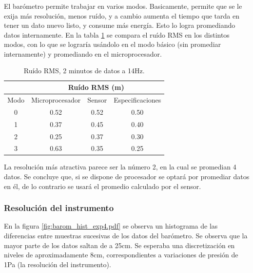 \documentclass[spanish,12pt,a4paper,titlepage]{report}
\begin{document}
El barómetro permite trabajar en varios modos. Basicamente, permite que se le exija más resolución, menos ruído, y a cambio aumenta el tiempo que tarda en tener un dato nuevo listo, y consume más energía. Esto lo logra promediando datos internamente. En la tabla \ref{tab:ruido-rms} se compara el ruído RMS en los distintos modos, con lo que se lograría usándolo en el modo básico (sin promediar internamente) y promediando en el microprocesador.

\begin{table}[H]
\centering
\begin{tabular}{c|c|c|c|} 
\cline{2-4}
	& \multicolumn{3}{|c|}{\cellcolor[gray]{0.8} Ruído RMS  (m)}      \\ \hline
\multicolumn{1}{|c|}{\cellcolor[gray]{0.8} {Modo}} & \cellcolor[gray]{0.8} {Microprocesador} &\cellcolor[gray]{0.8} {Sensor} &\cellcolor[gray]{0.8} {Especificaciones}\\ \hline

\multicolumn{1}{|c|}{0}	&	0.52	&	0.52	&	0.50\\
\hline
\multicolumn{1}{|c|}{1}	&	0.37	&	0.45	&	0.40\\
\hline
\multicolumn{1}{|c|}{2}	&	0.25	&	0.37	&	0.30\\
\hline
\multicolumn{1}{|c|}{3}	&	0.63	&	0.35	&	0.25\\
\hline

\end{tabular}
\caption{Ruído RMS, 2 minutos de datos a 14Hz.}
\label{tab:ruido-rms}
\end{table}
\vspace{-15pt}
La resolución más atractiva parece ser la número 2, en la cual se promedian 4 datos. Se concluye que, si se dispone de procesador se optará por promediar datos en él, de lo contrario se usará el promedio calculado por el sensor.

\subsubsection{Resolución del instrumento}
En la figura \ref{fig:barom_hist_exp4.pdf} se observa un histograma de las diferencias entre muestras sucesivas de los datos del barómetro. Se observa que la mayor parte de los datos saltan de a 25cm. Se esperaba una discretización en niveles de  aproximadamente 8cm, correspondientes a variaciones de presión de 1Pa (la resolución del instrumento).
\end{document}
